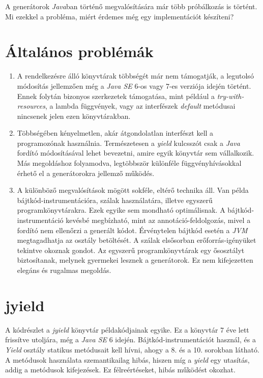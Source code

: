 \documentclass[12pt, a4paper]{article}
\begin{document}
A generátorok \textit{Java}ban történő megvalósítására már több próbálkozás is történt. Mi ezekkel a probléma, miért érdemes még egy implementációt készíteni?

\section{Általános problémák}
\begin{enumerate}
    \item
    A rendelkezésre álló könyvtárak többségét már nem támogatják, a legutolsó módosítás jellemzően még a \textit{Java SE} 6-os vagy 7-es verziója idején történt. Ennek folytán bizonyos szerkezetek támogatása, mint például a \textit{try-with-resources}, a lambda függvények, vagy az interfészek \textit{default} metódusai nincsenek jelen ezen könyvtárakban.
    \item
    Többségében kényelmetlen, akár átgondolatlan interfészt kell a programozónak használnia. Természetesen a \textit{yield} kulcsszót csak a \textit{Java} fordító módosításával lehet bevezetni, amire egyik könyvtár sem vállalkozik. Más megoldáshoz folyamodva, legtöbbször különféle függvényhívásokkal érhető el a generátorokra jellemző működés.
    \item
    A különböző megvalósítások mögött sokféle, eltérő technika áll. Van példa bájtkód-instrumentációra, szálak használatára, illetve egyszerű programkönyvtárakra. Ezek egyike sem mondható optimálisnak. A bájtkód-instrumentáció kevésbé megbízható, mint az annotáció-feldolgozás, mivel a fordító nem ellenőrzi a generált kódot. Érvénytelen bájtkód esetén a \textit{JVM} megtagadhatja az osztály betöltését. A szálak elsősorban erőforrás-igényüket tekintve okoznak gondot. Az egyszerű programkönyvtárak egy ősosztályt biztosítanak, melynek gyermekei lesznek a generátorok. Ez nem kifejezetten elegáns és rugalmas megoldás.
\end{enumerate}

\section{jyield}
A kódrészlet a \textit{jyield} könyvtár példakódjainak egyike. Ez a könyvtár 7 éve lett frissítve utoljára, még a \textit{Java SE} 6 idején. Bájtkód-instrumentációt használ, és a \textit{Yield} osztály statikus metódusait kell hívni, ahogy a 8. és a 10. sorokban látható. A metódusok használata szemantikailag hibás, hiszen míg a \textit{yield} egy utasítás, addig a metódusok kifejezések. Ez félreértéseket, hibás működést okozhat.
\end{document}
